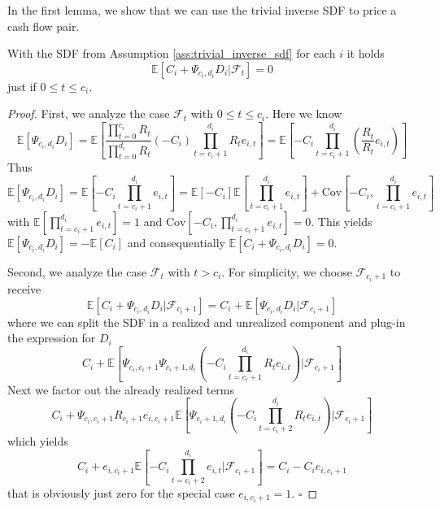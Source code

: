 \iffalse

In the first lemma, we show that we can use the trivial inverse SDF to price a cash flow pair.

\begin{lemma}
	\label{lemma:single_cash_flow_price}
	With the SDF from Assumption \ref{ass:trivial_inverse_sdf} for each $i$  it holds 
	\[
	\mathbb{E} \left[ C_i + \Psi_{c_i,d_i} D_i |  \mathcal{F}_{t} \right] = 0
	\]
	just if $0 \leq t \leq c_i$.
\end{lemma}

\begin{proof}
	First, we analyze the case $\mathcal{F}_{t}$ with $0 \leq t \leq c_i$.
	Here we know
	\[
	\mathbb{E} \left[ \Psi_{c_i,d_i} D_i \right] = 
	\mathbb{E} \left[ \frac{\prod_{t=0}^{c_i} R_t}{\prod_{t=0}^{d_i} R_t} \left( -C_i \right) \prod_{t=c_i+1}^{d_i} R_t e_{i,t}  \right] =
	\mathbb{E} \left[ -C_i \prod_{t=c_i+1}^{d_i} \left( \frac{R_t}{R_t} e_{i,t} \right) \right]
	\]
	Thus
	\[
	\mathbb{E} \left[ \Psi_{c_i,d_i} D_i \right]=\mathbb{E} \left[ -C_i \prod_{t=c_i+1}^{d_i} e_{i,t} \right]= \mathbb{E} \left[ -C_i \right] \mathbb{E} \left[ \prod_{t=c_i+1}^{d_i} e_{i,t} \right] + \mathrm{Cov} \left[ -C_i, \prod_{t=c_i+1}^{d_i} e_{i,t} \right]
	\] 
	with $\mathbb{E} \left[ \prod_{t=c_i+1}^{d_i} e_{i,t} \right] = 1$ and $\mathrm{Cov} \left[ -C_i, \prod_{t=c_i+1}^{d_i} e_{i,t} \right]=0$.
	This yields $\mathbb{E} \left[ \Psi_{c_i,d_i} D_i \right]=-\mathbb{E} \left[ C_i \right]$ and consequentially $\mathbb{E} \left[ C_i + \Psi_{c_i,d_i} D_i  \right] = 0$. 
	
	Second, we analyze the case $\mathcal{F}_{t}$ with $t > c_i$.
	For simplicity, we choose $\mathcal{F}_{c_i+1}$ to receive
	\[
	\mathbb{E} \left[ C_i + \Psi_{c_i,d_i} D_i | \mathcal{F}_{c_i+1} \right] =
	C_i + \mathbb{E} \left[ \Psi_{c_i,d_i} D_i | \mathcal{F}_{c_i+1} \right]
	\]
	where we can split the SDF in a realized and unrealized component and plug-in the expression for $D_i$
	\[
	C_i + \mathbb{E} \left[ \Psi_{c_i,c_i+1} \Psi_{c_i+1,d_i} \left( -C_i \prod_{t=c_i+1}^{d_i} R_t e_{i,t} \right) | \mathcal{F}_{c_i+1} \right]
	\]
	Next we factor out the already realized terms
	\[
	C_i + \Psi_{c_i,c_i+1} R_{c_i+1} e_{i,c_i+1}
	\mathbb{E} \left[  \Psi_{c_i+1,d_i} \left( -C_i \prod_{t=c_i+2}^{d_i} R_t e_{i,t} \right) | \mathcal{F}_{c_i+1} \right]
	\]
	which yields
	\[
	C_i + e_{i,c_i+1}
	\mathbb{E} \left[  -C_i \prod_{t=c_i+2}^{d_i} e_{i,t} | \mathcal{F}_{c_i+1} \right]
	=
	C_i - C_i e_{i,c_i+1}
	\]
	that is obviously just zero for the special case $e_{i,c_i+1}=1$.
	$\square$
\end{proof}

